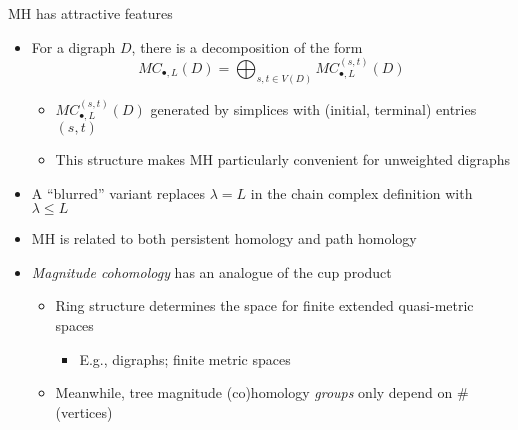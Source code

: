 \documentclass[usenames,dvipsnames,10pt,aspectratio=169]{beamer}
\begin{document}
\begin{frame}{MH has attractive features}
	\begin{itemize}
		\item<1-> For a digraph $D$, there is a decomposition of the form $$MC_{\bullet,L}(D) = \bigoplus_{s,t \in V(D)} MC_{\bullet,L}^{(s,t)}(D)$$
		\begin{itemize}
			\item<1-> $MC_{\bullet,L}^{(s,t)}(D)$ generated by simplices with (initial, terminal) entries $(s,t)$
			\item<2-> This structure makes MH particularly convenient for unweighted digraphs
		\end{itemize}
		\item<3-> A ``blurred'' variant replaces $\lambda = L$ in the chain complex definition with $\lambda \le L$
		\item<4-> MH is related to both persistent homology and path homology
		\item<5-> \emph{Magnitude cohomology} has an analogue of the cup product
		\begin{itemize}
			\item<5-> Ring structure determines the space for finite extended quasi-metric spaces 
			\begin{itemize}
				\item<5-> E.g., digraphs; finite metric spaces
			\end{itemize}
			\item<5-> Meanwhile, tree magnitude (co)homology \emph{groups} only depend on \#(vertices)
		\end{itemize} 
	\end{itemize}
\end{frame}
\end{document}
